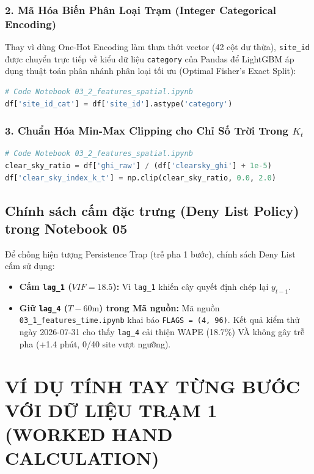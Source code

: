 \documentclass[12pt,a4paper]{article}
\begin{document}
\subsubsection{2. Mã Hóa Biến Phân Loại Trạm (Integer Categorical Encoding)}
Thay vì dùng One-Hot Encoding làm thưa thớt vector (42 cột dư thừa), \texttt{site\_id} được chuyển trực tiếp về kiểu dữ liệu \texttt{category} của Pandas để LightGBM áp dụng thuật toán phân nhánh phân loại tối ưu (Optimal Fisher's Exact Split):
\begin{lstlisting}[language=Python]
# Code Notebook 03_2_features_spatial.ipynb
df['site_id_cat'] = df['site_id'].astype('category')
\end{lstlisting}

\subsubsection{3. Chuẩn Hóa Min-Max Clipping cho Chỉ Số Trời Trong \texorpdfstring{$K_t$}{Kt}}
\begin{lstlisting}[language=Python]
# Code Notebook 03_2_features_spatial.ipynb
clear_sky_ratio = df['ghi_raw'] / (df['clearsky_ghi'] + 1e-5)
df['clear_sky_index_k_t'] = np.clip(clear_sky_ratio, 0.0, 2.0)
\end{lstlisting}

\subsection{Chính sách cấm đặc trưng (Deny List Policy) trong Notebook 05}
Để chống hiện tượng Persistence Trap (trễ pha 1 bước), chính sách Deny List cấm sử dụng:
\begin{itemize}
    \item \textbf{Cấm \texttt{lag\_1} ($VIF=18.5$):} Vì \texttt{lag\_1} khiến cây quyết định chép lại $y_{t-1}$.
    \item \textbf{Giữ \texttt{lag\_4} ($T-60\text{m}$) trong Mã nguồn:} Mã nguồn\\ \texttt{03\_1\_\allowbreak features\_\allowbreak time.ipynb} khai báo \texttt{FLAGS = (4, 96)}. Kết quả kiểm thử ngày 2026-07-31 cho thấy \texttt{lag\_4} cải thiện WAPE (18.7\%) VÀ không gây trễ pha (+1.4 phút, 0/40 site vượt ngưỡng).
\end{itemize}

\section[VÍ DỤ TÍNH TAY TỪNG BƯỚC TRẠM 1]{VÍ DỤ TÍNH TAY TỪNG BƯỚC VỚI DỮ LIỆU TRẠM 1\\(WORKED HAND CALCULATION)}
\end{document}
